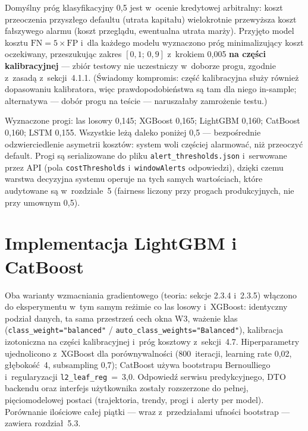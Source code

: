 Domyślny próg klasyfikacyjny 0,5 jest w~ocenie kredytowej arbitralny: koszt
przeoczenia przyszłego defaultu (utrata kapitału) wielokrotnie przewyższa koszt
fałszywego alarmu (koszt przeglądu, ewentualna utrata marży). Przyjęto model
kosztu $\mathrm{FN} = 5 \times \mathrm{FP}$ i~dla każdego modelu wyznaczono próg
minimalizujący koszt oczekiwany, przeszukując zakres $[0{,}1;\,0{,}9]$
z~krokiem 0,005 \textbf{na części kalibracyjnej} --- zbiór testowy nie
uczestniczy w~doborze progu, zgodnie z~zasadą z~sekcji~4.1.1. (Świadomy
kompromis: część kalibracyjna służy również dopasowaniu kalibratora, więc
prawdopodobieństwa są tam dla niego in-sample; alternatywa --- dobór progu na
teście --- naruszałaby zamrożenie testu.)

Wyznaczone progi: las losowy 0,145; XGBoost 0,165; LightGBM 0,160; CatBoost
0,160; LSTM 0,155. Wszystkie leżą daleko poniżej 0,5 --- bezpośrednie
odzwierciedlenie asymetrii kosztów: system woli częściej alarmować, niż
przeoczyć default. Progi są serializowane do pliku
\texttt{alert\_thresholds.json} i~serwowane przez API (pola
\texttt{costThresholds} i~\texttt{windowAlerts} odpowiedzi), dzięki czemu
warstwa decyzyjna systemu operuje na tych samych wartościach, które audytowane
są w~rozdziale~5 (fairness liczony przy progach produkcyjnych, nie przy
umownym 0,5).

\section{Implementacja LightGBM i CatBoost}

Oba warianty wzmacniania gradientowego (teoria: sekcje 2.3.4 i~2.3.5) włączono
do eksperymentu w~tym samym reżimie co las losowy i~XGBoost: identyczny podział
danych, ta sama przestrzeń cech okna W3, ważenie klas
(\texttt{class\_weight="balanced"} / \texttt{auto\_class\_weights="Balanced"}),
kalibracja izotoniczna na części kalibracyjnej i~próg kosztowy z~sekcji~4.7.
Hiperparametry ujednolicono z~XGBoost dla porównywalności (800~iteracji,
learning rate 0,02, głębokość~4, subsampling 0,7); CatBoost używa bootstrapu
Bernoulliego i~regularyzacji \texttt{l2\_leaf\_reg}~=~3,0. Odpowiedź serwisu
predykcyjnego, DTO backendu oraz interfejs użytkownika zostały rozszerzone do
pełnej, pięciomodelowej postaci (trajektoria, trendy, progi i~alerty per
model). Porównanie ilościowe całej piątki --- wraz z~przedziałami ufności
bootstrap --- zawiera rozdział~5.3.

